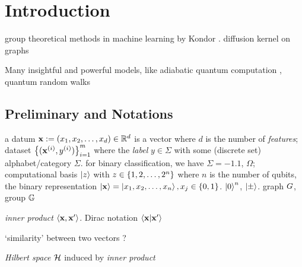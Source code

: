 
\section{Introduction}

group theoretical methods in machine learning by Kondor \cite{kondorGroupTheoreticalMethods2008}.
diffusion kernel on graphs \cite{kondorDiffusionKernelsGraphs2002}

Many insightful and powerful models, like adiabatic quantum computation \cite{farhiQuantumComputationAdiabatic2000}, quantum random walks \cite{childsQuantumInformationProcessing2004} 

\subsection{Preliminary and Notations}
a datum $\vb{x}:= (x_1,x_2,\dots,x_d) \in \mathbb{R}^d$ is a vector where $d$ is the number of \emph{features};
dataset $\qty{(\vb{x}^{(i)}, y^{(i)})}^{m}_{i=1}$ where the \emph{label} $y\in\Sigma$ with some (discrete set) alphabet/category $\Sigma$. 
for binary classification, we have $\Sigma=\qty{-1,1}$,
$\Omega$;
computational basis $\ket{z}$ with $z\in \qty{1,2,\dots,2^n}$ where $n$ is the number of qubits,
the binary representation $\ket{\vb{x}}=\ket{x_1,x_2,\dots,x_n},x_j\in \qty{0,1}$.
$\ket{0}^n$, $\ket{\pm}$.
graph $G$, group $\mathbb{G}$
\begin{definition}\label{def:inner_product}
	\emph{inner product} $\expval{\vb{x},\vb{x}'}$.
	Dirac notation $\braket{\vb{x}}{\vb{x}'}$
\end{definition}
`similarity' between two vectors ?
\begin{definition}\label{def:hilbert_space}
	\emph{Hilbert space} $\mathcal{H}$ induced by \emph{inner product}
\end{definition}

